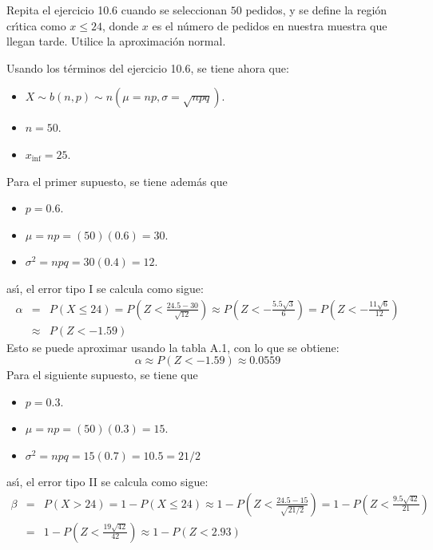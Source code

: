 \begin{enunciado}
 Repita el ejercicio 10.6 cuando se seleccionan $50$ pedidos, y se define la regi\'on cr\'{\i}tica como $x \leq 24$, donde $x$ es el n\'umero de pedidos en nuestra muestra que llegan tarde. Utilice la aproximaci\'on normal.
\end{enunciado}

\begin{solucion}
 Usando los t\'erminos del ejercicio 10.6, se tiene ahora que:
 \begin{itemize}
  \item $X \sim b(n,p) \sim n\left( \mu = np, \sigma = \sqrt{npq} \right)$.
  \item $n = 50$.
  \item $x_{\text{inf}} = 25$.
 \end{itemize}
 Para el primer supuesto, se tiene adem\'as que
 \begin{itemize}
  \item $p = 0.6$.
  \item $\mu = np = (50)(0.6) = 30$.
  \item $\sigma^2 = npq = 30(0.4) = 12$.
 \end{itemize}
 as\'{\i}, el error tipo I se calcula como sigue:
 \begin{eqnarray*}
  \alpha & = & P(X \leq 24) = P\left( Z < \frac{24.5 - 30}{\sqrt{12}} \right) \approx P\left( Z < -\frac{5.5\sqrt{3}}{6} \right) = P\left( Z < -\frac{11\sqrt{6}}{12} \right) \\
  & \approx & P\left( Z < - 1.59 \right)
 \end{eqnarray*}
 Esto se puede aproximar usando la tabla A.1, con lo que se obtiene:
 \begin{equation*}
  \alpha \approx P\left( Z < - 1.59 \right) \approx 0.0559
 \end{equation*}
 Para el siguiente supuesto, se tiene que
 \begin{itemize}
  \item $p = 0.3$.
  \item $\mu = np = (50)(0.3) = 15$.
  \item $\sigma^2 = npq = 15(0.7) = 10.5 = 21/2$
 \end{itemize}
 as\'{\i}, el error tipo II se calcula como sigue:
 \begin{eqnarray*}
  \beta & = & P(X > 24) = 1 - P(X \leq 24) \approx 1 - P\left( Z < \frac{24.5 - 15}{\sqrt{21/2}} \right) = 1 - P\left( Z < \frac{9.5\sqrt{42}}{21} \right) \\
  & = & 1 - P\left( Z < \frac{19\sqrt{42}}{42} \right) \approx 1 - P(Z < 2.93)

\end{eqnarray*}
\end{solucion}
